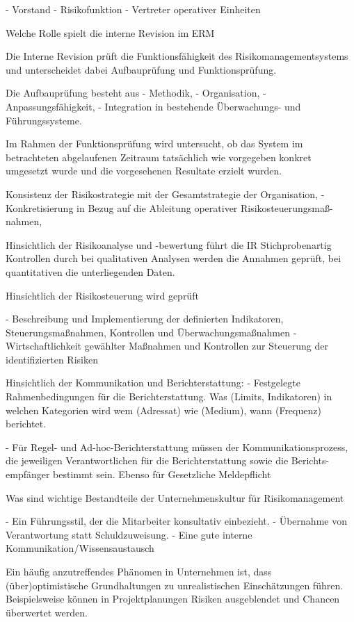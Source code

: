 - Vorstand 
- Risikofunktion 
- Vertreter operativer Einheiten

Welche Rolle spielt die interne Revision im ERM

Die Interne Revision prüft die Funktionsfähigkeit des Risikomanagementsystems
und unterscheidet dabei Aufbauprüfung und Funktionsprüfung.

Die Aufbauprüfung besteht aus
- Methodik,
- Organisation,
- Anpassungsfähigkeit,
- Integration in bestehende Überwachungs- und Führungssysteme.

Im Rahmen der Funktionsprüfung wird untersucht, ob das System im betrachteten
abgelaufenen Zeitraum tatsächlich wie vorgegeben konkret umgesetzt wurde und
die vorgesehenen Resultate erzielt wurden.

Konsistenz der Risikostrategie mit der Gesamtstrategie der Organisation,
- Konkretisierung in Bezug auf die Ableitung operativer Risikosteuerungsmaß-
nahmen,

Hinsichtlich der Risikoanalyse und -bewertung führt die IR Stichprobenartig Kontrollen durch 
bei qualitativen Analysen werden die Annahmen geprüft, bei quantitativen die unterliegenden Daten.

Hinsichtlich der Risikosteuerung wird geprüft 

- Beschreibung und Implementierung der definierten Indikatoren, Steuerungsmaßnahmen, Kontrollen und Überwachungsmaßnahmen
- Wirtschaftlichkeit gewählter Maßnahmen und Kontrollen zur Steuerung der
identifizierten Risiken

Hinsichtlich der Kommunikation und Berichterstattung:
- Festgelegte Rahmenbedingungen für die Berichterstattung. 
Was (Limits, Indikatoren) in welchen Kategorien wird wem (Adressat) wie (Medium), wann (Frequenz) berichtet.

- Für Regel- und Ad-hoc-Berichterstattung müssen der Kommunikationsprozess,
die jeweiligen Verantwortlichen für die Berichterstattung sowie die Berichts-
empfänger bestimmt sein. Ebenso für Gesetzliche Meldepflicht 


Was sind wichtige Bestandteile der Unternehmenskultur für Risikomanagement 

- Ein Führungsstil, der die Mitarbeiter konsultativ einbezieht.
- Übernahme von Verantwortung statt Schuldzuweisung.
- Eine gute interne Kommunikation/Wissensaustausch


Ein häufig anzutreffendes Phänomen in Unternehmen ist, dass (über)optimistische
Grundhaltungen zu unrealistischen Einschätzungen führen. Beispielsweise können
in Projektplanungen Risiken ausgeblendet und Chancen überwertet werden.

